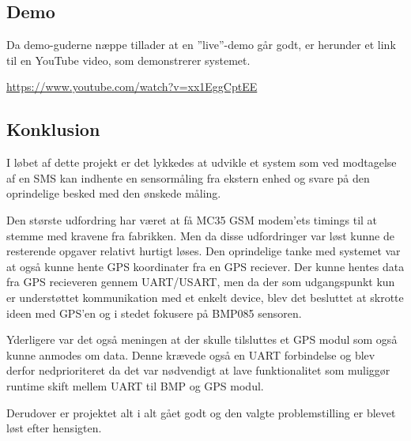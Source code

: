 \subsection{Demo}
Da demo-guderne næppe tillader at en ''live''-demo går godt, er herunder et link til en YouTube video, som demonstrerer systemet.

\vskip 0.5cm
	\begin{center}
		\url{https://www.youtube.com/watch?v=xx1EggCptEE}
	\end{center}
\vskip 0.5cm

\subsection{Konklusion}

I løbet af dette projekt er det lykkedes at udvikle et system som ved modtagelse af en SMS kan indhente en sensormåling fra ekstern enhed og svare på den oprindelige besked med den ønskede måling. 

Den største udfordring har været at få MC35 GSM modem'ets timings til at stemme med kravene fra fabrikken. Men da disse udfordringer var løst kunne de resterende opgaver relativt hurtigt løses.
Den oprindelige tanke med systemet var at også kunne hente GPS koordinater fra en GPS reciever. Der kunne hentes data fra GPS recieveren gennem UART/USART, men da der som udgangspunkt kun 
er understøttet kommunikation med et enkelt device, blev det besluttet at skrotte ideen med GPS'en og i stedet fokusere på BMP085 sensoren.

Yderligere var det også meningen at der skulle tilsluttes et GPS modul som også kunne anmodes om data. Denne krævede også en UART forbindelse og blev derfor nedprioriteret da det var nødvendigt at lave funktionalitet som muliggør runtime skift mellem UART til BMP og GPS modul.

Derudover er projektet alt i alt gået godt og den valgte problemstilling er blevet løst efter hensigten. 
